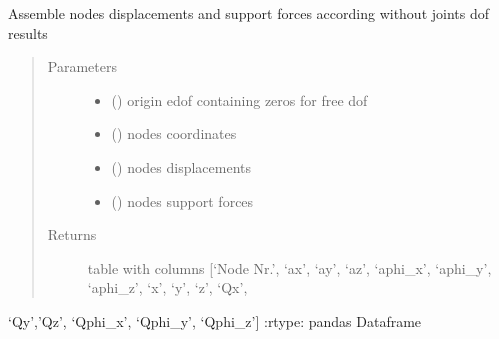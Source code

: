 \documentclass[letterpaper,10pt,english]{sphinxmanual}
\begin{document}
\begin{fulllineitems}
\label{\detokenize{api:beamon.core.assemble_nodes_results}}
Assemble nodes displacements and support forces according without joints dof results
\begin{quote}\begin{description}
\item[{Parameters}] \leavevmode\begin{itemize}
\item {} 
 () \textendash{} origin edof containing zeros for free dof

\item {} 
 () \textendash{} nodes coordinates

\item {} 
 () \textendash{} nodes displacements

\item {} 
 () \textendash{} nodes support forces

\end{itemize}

\item[{Returns}] \leavevmode
table with columns {[}‘Node Nr.’, ‘ax’, ‘ay’, ‘az’, ‘aphi\_x’, ‘aphi\_y’, ‘aphi\_z’, ‘x’, ‘y’, ‘z’, ‘Qx’,

\end{description}\end{quote}

‘Qy’,’Qz’, ‘Qphi\_x’, ‘Qphi\_y’, ‘Qphi\_z’{]}
:rtype: pandas Dataframe

\end{fulllineitems}

\end{document}
